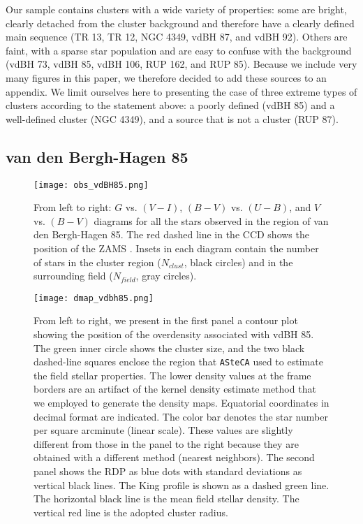 \documentclass[draft]{aa}
\begin{document}
Our sample contains clusters with a wide variety of properties: some are
bright, clearly detached from the cluster background and therefore have a
clearly defined main sequence (TR 13, TR 12, NGC 4349, vdBH 87, and vdBH 92).
Others are faint, with a sparse star population and are easy to
confuse with the background (vdBH 73, vdBH 85, vdBH 106, RUP 162, and RUP 85).
Because we include very many figures in this paper, we therefore decided to
add these sources to an appendix. We limit ourselves here to presenting
the case of three extreme types of clusters according to the statement
above: a poorly defined (vdBH 85) and a well-defined cluster (NGC 4349), and a
source that is not a cluster (RUP 87).






\subsection{van den Bergh-Hagen 85}
\label{ssec:vdbh85}

\begin{figure*}[ht]
    \centering
    \texttt{[image: obs\_vdBH85.png]}
\caption{From left to right: $G$ vs. $(V-I)$, $(B-V)$ vs. $(U-B)$, and
$V$ vs. $(B-V)$ diagrams for all the stars observed in the region of van
den Bergh-Hagen 85.
The red dashed line in the CCD shows the position of the ZAMS
\citep{Aller1982}. Insets in each diagram contain the number of stars 
in the cluster region ($N_{clust}$, black circles) and in the surrounding
field ($N_{field}$, gray circles).
}
    \label{fig:photom_vdBH85} %
\end{figure*}

\begin{figure*}[ht]
    \centering
    \texttt{[image: dmap\_vdbh85.png]}
\caption{From left to right, we present in the first panel
a contour plot showing the position of the overdensity associated with vdBH 85.
The green inner circle shows the cluster size, and the two black dashed-line
squares enclose the region that \texttt{ASteCA} used to estimate the field
stellar properties. The lower density values at the frame borders are an
artifact of the kernel density estimate method that we employed to generate the density
maps.
Equatorial coordinates in decimal format are indicated.
The color bar denotes the star number per square arcminute (linear scale).
These values are slightly different from those in the panel to the right
because they are obtained with a different method (nearest neighbors).
%
The second panel shows the RDP as blue dots with standard deviations as
vertical black lines. The King profile is shown as a dashed green line. The
horizontal black line is the mean field stellar density. The vertical red line is the
adopted cluster radius.
}
    \label{fig:struct_vdBH85}
\end{figure*}
\end{document}
